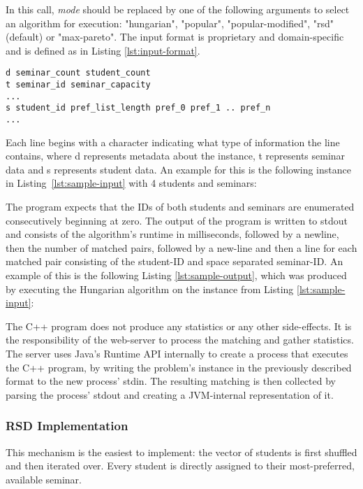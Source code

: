 In this call, \emph{mode} should be replaced by one of the following arguments to select an algorithm for execution: "hungarian", "popular", "popular-modified", "rsd" (default) or "max-pareto". The input format is proprietary and domain-specific and is defined as in Listing \ref{lst:input-format}.

\begin{lstlisting}[frame=single, float, label=lst:input-format, caption={Program input format},captionpos=b]
d seminar_count student_count
t seminar_id seminar_capacity
...
s student_id pref_list_length pref_0 pref_1 .. pref_n
...
\end{lstlisting}

Each line begins with a character indicating what type of information the line contains, where d represents metadata about the instance, t represents seminar data and s represents student data. An example for this is the following instance in \mbox{Listing \ref{lst:sample-input}} with 4 students and seminars:


The program expects that the IDs of both students and seminars are enumerated consecutively beginning at zero. The output of the program is written to stdout and consists of the algorithm's runtime in milliseconds, followed by a newline, then the number of matched pairs, followed by a new-line and then a line for each matched pair consisting of the student-ID and space separated seminar-ID. An example of this is the following Listing \ref{lst:sample-output}, which was produced by executing the Hungarian algorithm on the instance from Listing \ref{lst:sample-input}:


The C++ program does not produce any statistics or any other side-effects. It is the responsibility of the web-server to process the matching and gather statistics. The server uses Java's Runtime API internally to create a process that executes the C++ program, by writing the problem's instance in the previously described format to the new process' stdin. The resulting matching is then collected by parsing the process' stdout and creating a JVM-internal representation of it. 

\subsubsection{RSD Implementation}
This mechanism is the easiest to implement: the vector of students is first shuffled and then iterated over. Every student is directly assigned to their most-preferred, available seminar.

